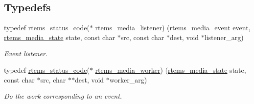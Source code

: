 \subsection*{Typedefs}
\begin{DoxyCompactItemize}
\item 
typedef \mbox{\hyperlink{group__ClassicStatus_ga545d41846817eaba6143d52ee4d9e9fe}{rtems\+\_\+status\+\_\+code}}($\ast$ \mbox{\hyperlink{group__RTEMSIOMedia_ga8f3e1a300d58555b3c2921df90d2d637}{rtems\+\_\+media\+\_\+listener}}) (\mbox{\hyperlink{group__RTEMSIOMedia_gadd58c5799ee997413d4d6be2ac05197b}{rtems\+\_\+media\+\_\+event}} event, \mbox{\hyperlink{group__RTEMSIOMedia_gaaec542a8c74e36e4edf774f2313fcd7c}{rtems\+\_\+media\+\_\+state}} state, const char $\ast$src, const char $\ast$dest, void $\ast$listener\+\_\+arg)
\begin{DoxyCompactList}\small\item\em Event listener. \end{DoxyCompactList}\item 
typedef \mbox{\hyperlink{group__ClassicStatus_ga545d41846817eaba6143d52ee4d9e9fe}{rtems\+\_\+status\+\_\+code}}($\ast$ \mbox{\hyperlink{group__RTEMSIOMedia_ga4d3df16c316c9285e61bf0f735cafdd3}{rtems\+\_\+media\+\_\+worker}}) (\mbox{\hyperlink{group__RTEMSIOMedia_gaaec542a8c74e36e4edf774f2313fcd7c}{rtems\+\_\+media\+\_\+state}} state, const char $\ast$src, char $\ast$$\ast$dest, void $\ast$worker\+\_\+arg)
\begin{DoxyCompactList}\small\item\em Do the work corresponding to an event. \end{DoxyCompactList}\end{DoxyCompactItemize}

